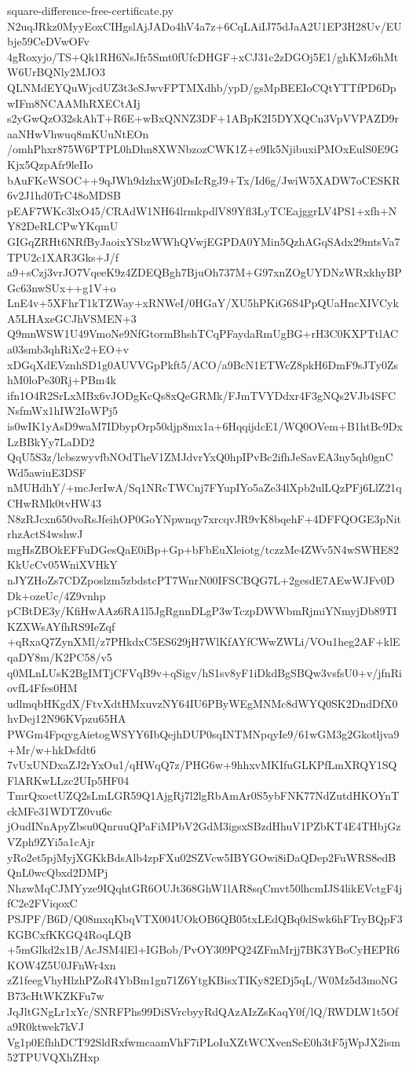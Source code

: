 \documentclass[11pt]{article}
\theoremstyle{definition}
\theoremstyle{remark}
\begin{document}
\begin{filecontents*}[overwrite]{square-difference-free-certificate.py}
N2uqJRkz0MyyEoxCIHgslAjJADo4hV4a7z+6CqLAiIJ75dJaA2U1EP3H28Uv/EUbje59CeDVwOFv
4gRoxyjo/TS+Qk1RH6NsJfr5Smt0fUfcDHGF+xCJ31c2zDGOj5E1/ghKMz6hMtW6UrBQNly2MJO3
QLNMdEYQuWjcdUZ3t3eSJwvFPTMXdhb/ypD/gsMpBEEIoCQtYTTfPD6DpwIFm8NCAAMhRXECtAIj
s2yGwQzO32skAhT+R6E+wBxQNNZ3DF+1ABpK2I5DYXQCn3VpVVPAZD9raaNHwVhwuq8mKUuNtEOn
/omhPhxr875W6PTPL0hDhn8XWNbzozCWK1Z+e9Ik5NjibuxiPMOxEulS0E9GKjx5QzpAfr9leIIo
bAuFKcWSOC++9qJWh9dzhxWj0DsIcRgJ9+Tx/Id6g/JwiW5XADW7oCESKR6v2J1hd0TrC48oMDSB
pEAF7WKc3lxO45/CRAdW1NH64lrmkpdlV89Yfl3LyTCEajggrLV4PS1+xfh+NY82DeRLCPwYKqmU
GIGqZRHt6NRfByJaoixYSbzWWhQVwjEGPDA0YMin5QzhAGqSAdx29mtsVa7TPU2c1XAR3Gks+J/f
a9+sCzj3vrJO7VqeeK9z4ZDEQBgh7BjuOh737M+G97xnZOgUYDNzWRxkhyBPGc63nwSUx++g1V+o
LnE4v+5XFhrT1kTZWay+xRNWeI/0HGaY/XU5hPKiG6S4PpQUaHncXIVCykA5LHAxeGCJhVSMEN+3
Q9mnWSW1U49VmoNe9NfGtormBhshTCqPFaydaRmUgBG+rH3C0KXPTtlACa03smb3qhRiXc2+EO+v
xDGqXdEVznhSD1g0AUVVGpPkft5/ACO/a9BcN1ETWcZ8pkH6DmF9sJTy0ZshM0loPe30Rj+PBm4k
ifn1O4R2SrLxMBx6vJODgKcQs8xQeGRMk/FJmTVYDdxr4F3gNQs2VJb4SFCNsfmWx1hIW2IoWPj5
is0wIK1yAsD9waM7IDbypOrp50djp8mx1a+6HqqijdcE1/WQ0OVem+B1htBc9DxLzBBkYy7LaDD2
QqU5S3z/lcbszwyvfbNOdTheV1ZMJdvrYxQ0hpIPvBc2ifhJeSavEA3ny5qh0gnCWd5awiuE3DSF
nMUHdhY/+mcJerIwA/Sq1NRcTWCnj7FYupIYo5aZe34lXpb2ulLQzPFj6LlZ21qCHwRMk0tvHW43
N8zRJcxn650voRsJfeihOP0GoYNpwnqy7xrcqvJR9vK8bqehF+4DFFQOGE3pNitrhzActS4wshwJ
mgHsZBOkEFFuDGesQaE0iBp+Gp+bFbEuXleiotg/tczzMe4ZWv5N4wSWHE82KkUcCv05WniXVHkY
nJYZHoZs7CDZposlzm5zbdstcPT7WnrN00IFSCBQG7L+2gesdE7AEwWJFv0DDk+ozeUc/4Z9vnhp
pCBtDE3y/KfiHwAAz6RA1l5JgRgnnDLgP3wTczpDWWbmRjmiYNmyjDb89TIKZXWsAYfhRS9IeZqf
+qRxaQ7ZynXMl/z7PHkdxC5ES629jH7WlKfAYfCWwZWLi/VOu1heg2AF+klEqaDY8m/K2PC58/v5
q0MLnLUsK2BgIMTjCFVqB9v+qSigv/hS1sv8yF1iDkdBgSBQw3vsfsU0+v/jfnRiovfL4Ffes0HM
udlmqbHKgdX/FtvXdtHMxuvzNY64IU6PByWEgMNMc8dWYQ0SK2DndDfX0hvDej12N96KVpzu65HA
PWGm4FpqygAietogWSYY6IbQejhDUP0sqINTMNpqyIe9/61wGM3g2Gkotljva9+Mr/w+hkDsfdt6
7vUxUNDxaZJ2rYxOu1/qHWqQ7z/PHG6w+9hhxvMKIfuGLKPfLmXRQY1SQFlARKwLLzc2UIp5HF04
TmrQxoctUZQ2sLmLGR59Q1AjgRj7l2lgRbAmAr0S5ybFNK77NdZutdHKOYnTckMFe31WDTZ0vu6c
jOudINnApyZbsu0QnruuQPaFiMPbV2GdM3igsxSBzdHhuV1PZbKT4E4THbjGzVZph9ZYi5a1cAjr
yRo2et5pjMyjXGKkBdsAlb4zpFXu02SZVcw5IBYGOwi8iDaQDep2FuWRS8edBQnL0wcQbxd2DMPj
NhzwMqCJMYyze9IQqhtGR6OUJt368GhW1lAR8sqCmvt50lhcmIJS4likEVctgF4jfC2e2FViqoxC
PSJPF/B6D/Q08mxqKbqVTX004UOkOB6QB05txLEdQBq0dSwk6hFTryBQpF3KGBCxfKKGQ4RoqLQB
+5mGlkd2x1B/AcJSM4lEl+IGBob/PvOY309PQ24ZFmMrjj7BK3YBoCyHEPR6KOW4Z5U0JFnWr4xn
zZ1feegVhyHlzhPZoR4YbBm1gn71Z6YtgKBisxTIKy82EDj5qL/W0Mz5d3moNGB73cHtWKZKFu7w
JqJltGNgLr1xYc/SNRFPhs99DiSVrcbyyRdQAzAIzZsKaqY0f/lQ/RWDLW1t5Ofa9R0ktwek7kVJ
Vg1p0EfhhDCT92SldRxfwmcaamVhF7iPLoIuXZtWCXvenSeE0h3tF5jWpJX2ism52TPUVQXhZHxp

\end{filecontents*}
\end{document}

